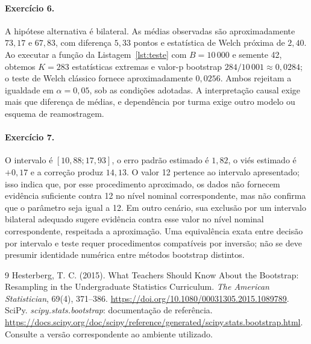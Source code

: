 \documentclass[12pt,a4paper]{article}
\begin{document}
\paragraph{Exercício 6.} A hipótese alternativa é bilateral. As médias observadas são aproximadamente $73{,}17$ e $67{,}83$, com diferença $5{,}33$ pontos e estatística de Welch próxima de $2{,}40$. Ao executar a função da Listagem~\ref{lst:teste} com $B=10\,000$ e semente 42, obtemos $K=283$ estatísticas extremas e valor-p bootstrap $284/10\,001\approx0{,}0284$; o teste de Welch clássico fornece aproximadamente $0{,}0256$. Ambos rejeitam a igualdade em $\alpha=0{,}05$, sob as condições adotadas. A interpretação causal exige mais que diferença de médias, e dependência por turma exige outro modelo ou esquema de reamostragem.

\paragraph{Exercício 7.} O intervalo é $[10{,}88;17{,}93]$, o erro padrão estimado é $1{,}82$, o viés estimado é $+0{,}17$ e a correção produz $14{,}13$. O valor 12 pertence ao intervalo apresentado; isso indica que, por esse procedimento aproximado, os dados não fornecem evidência suficiente contra 12 no nível nominal correspondente, mas não confirma que o parâmetro seja igual a 12. Em outro cenário, sua exclusão por um intervalo bilateral adequado sugere evidência contra esse valor no nível nominal correspondente, respeitada a aproximação. Uma equivalência exata entre decisão por intervalo e teste requer procedimentos compatíveis por inversão; não se deve presumir identidade numérica entre métodos bootstrap distintos.

\begin{thebibliography}{9}
 Hesterberg, T. C. (2015). What Teachers Should Know About the Bootstrap: Resampling in the Undergraduate Statistics Curriculum. \emph{The American Statistician}, 69(4), 371--386. \url{https://doi.org/10.1080/00031305.2015.1089789}.
 SciPy. \emph{scipy.stats.bootstrap}: documentação de referência. \url{https://docs.scipy.org/doc/scipy/reference/generated/scipy.stats.bootstrap.html}. Consulte a versão correspondente ao ambiente utilizado.
\end{thebibliography}
\end{document}
